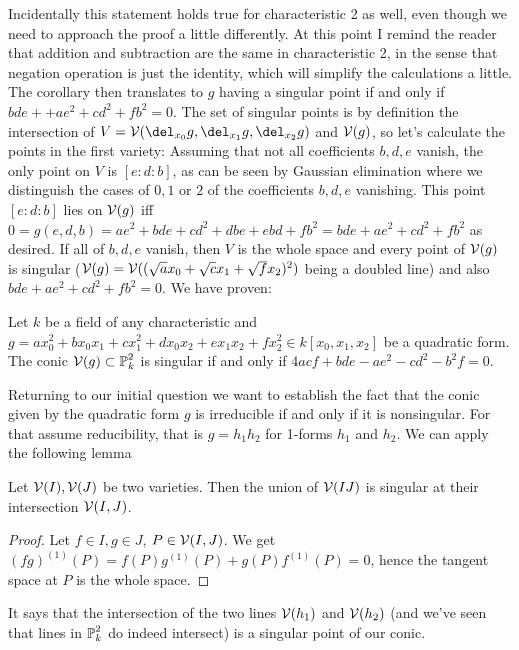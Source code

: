 Incidentally this statement holds true for characteristic 2 as well, even though we need to approach the proof a little differently.
At this point I remind the reader that addition and subtraction are the same in characteristic 2, in the sense that negation operation is just the identity, which will simplify the calculations a little.
The corollary then translates to $g$ having a singular point if and only if $bde + +ae^2 + cd^2 +fb^2 = 0$.
The set of singular points is by definition the intersection of $V = \V(\del_{x_0}g,\del_{x_1}g,\del_{x_2}g)$ and $\operatorname{\mathcal V}(g)$, so let's calculate the points in the first variety: Assuming that not all coefficients $b,d,e$ vanish, the only point on $V$ is $[e:d:b]$, as can be seen by Gaussian elimination where we distinguish the cases of $0,1$ or $2$ of the coefficients $b,d,e$ vanishing.
This point $[e:d:b]$ lies on $\operatorname{\mathcal V}(g)$ iff $0 = g(e,d,b) = ae^2 + bde + cd^2 + dbe + ebd + fb^2 = bde + ae^2 + cd^2 + fb^2$ as desired.
If all of $b,d,e$ vanish, then $V$ is the whole space and every point of $\operatorname{\mathcal V}(g)$ is singular ($\operatorname{\mathcal V}(g) = \operatorname{\mathcal V}((\sqrt{a}x_0 + \sqrt{c}x_1 + \sqrt{f}x_2)^2)$ being a doubled line) and also $bde + ae^2 + cd^2 + fb^2 = 0$. We have proven:

\begin{corollary} \label{corollarySingularConic}
Let $k$ be a field of any characteristic and $g = ax_0^2 + bx_0x_1 + cx_1^2 + dx_0x_2 + ex_1x_2 + fx_2^2
 \in k[x_0,x_1,x_2]$ be a quadratic form. The conic $\operatorname{\mathcal V}(g) \subset \operatorname{\mathbb P}^2_k$ is singular if and only if $4acf + bde - ae^2 - cd^2 - b^2f = 0$.
\end{corollary}


Returning to our initial question we want to establish the fact that the conic given by the quadratic form $g$ is irreducible if and only if it is nonsingular.
For that assume reducibility, that is $g = h_1h_2$ for 1-forms $h_1$ and $h_2$.
We can apply the following lemma
\begin{lemma} \label{lemmaSingularIntersect}
Let $\operatorname{\mathcal V}(I),\operatorname{\mathcal V}(J)$ be two varieties. Then the union of $\operatorname{\mathcal V}(IJ)$ is singular at their intersection $\operatorname{\mathcal V}(I,J)$.
\end{lemma}
\begin{proof}
Let $f\in I, g\in J$, $P\in \operatorname{\mathcal V}(I,J)$. We get $(fg)^{(1)}(P) = f(P)g^{(1)}(P) + g(P)f^{(1)}(P) = 0$, hence the tangent space at $P$ is the whole space.
\end{proof}
It says that the intersection of the two lines $\operatorname{\mathcal V}(h_1)$ and $\operatorname{\mathcal V}(h_2)$ (and we've seen that lines in $\operatorname{\mathbb P}^2_k$ do indeed intersect) is a singular point of our conic.

